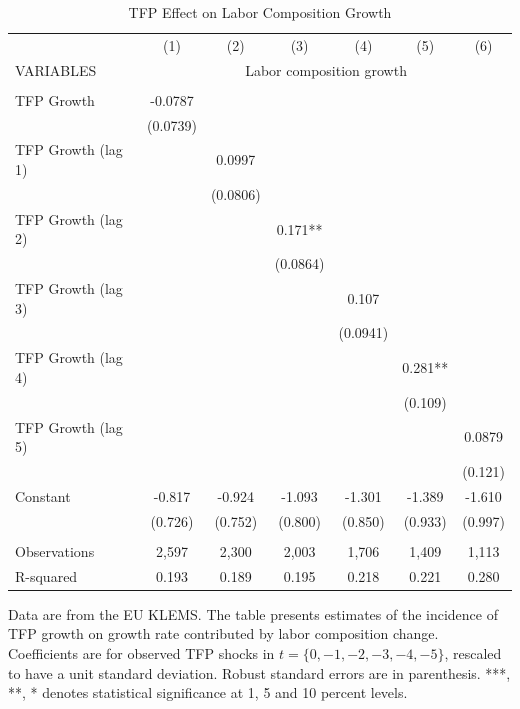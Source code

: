 \documentclass[12pt]{article}
\begin{document}
\begin{table}
\begin{center}
\scriptsize
\begin{tabular}{lcccccc} \hline \hline
 & (1) & (2) & (3) & (4) & (5) & (6)\\
VARIABLES & \multicolumn{6}{c}{Labor composition growth} \\ \hline
 &  &  &  &  &  &  \\
TFP Growth & -0.0787 &  &  &  &  &  \\
 & (0.0739) &  &  &  &  &  \\
TFP Growth (lag 1) &  & 0.0997 &  &  &  &  \\
 &  & (0.0806) &  &  &  &  \\
TFP Growth (lag 2) &  &  & 0.171** &  &  &  \\
 &  &  & (0.0864) &  &  &  \\
TFP Growth (lag 3) &  &  &  & 0.107 &  &  \\
 &  &  &  & (0.0941) &  &  \\
TFP Growth (lag 4) &  &  &  &  & 0.281** &  \\
 &  &  &  &  & (0.109) &  \\
TFP Growth (lag 5) &  &  &  &  &  & 0.0879 \\
 &  &  &  &  &  & (0.121) \\
Constant & -0.817 & -0.924 & -1.093 & -1.301 & -1.389 & -1.610 \\
 & (0.726) & (0.752) & (0.800) & (0.850) & (0.933) & (0.997) \\
 &  &  &  &  &  &  \\
Observations & 2,597 & 2,300 & 2,003 & 1,706 & 1,409 & 1,113 \\
 R-squared & 0.193 & 0.189 & 0.195 & 0.218 & 0.221 & 0.280 \\ \hline
\end{tabular}
\end{center}
\caption{TFP Effect on Labor Composition Growth}
\label{estimation2}
{\scriptsize Data are from the EU KLEMS. The table presents estimates of the incidence of TFP growth on growth rate contributed by labor composition change. Coefficients are for observed TFP shocks in $t = \{0,-1,-2,-3,-4,-5\}$, rescaled to have a unit standard deviation. Robust standard errors are in parenthesis. ***, **, * denotes statistical significance at 1, 5 and 10 percent levels.}
\end{table}
\end{document}
